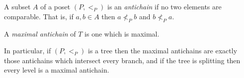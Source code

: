\documentclass[12pt]{article}
\begin{document}
A subset $A$ of a poset $(P,<_P)$ is an \emph{antichain} if no two elements are comparable.  That is, if $a,b\in A$ then $a\nless_P b$ and $b\nless_P a$.  

A \emph{maximal antichain} of $T$ is one which is maximal.

In particular, if $(P,<_P)$ is a tree then the maximal antichains are exactly those antichains which intersect every branch, and if the tree is splitting then every level is a maximal antichain.
\end{document}
